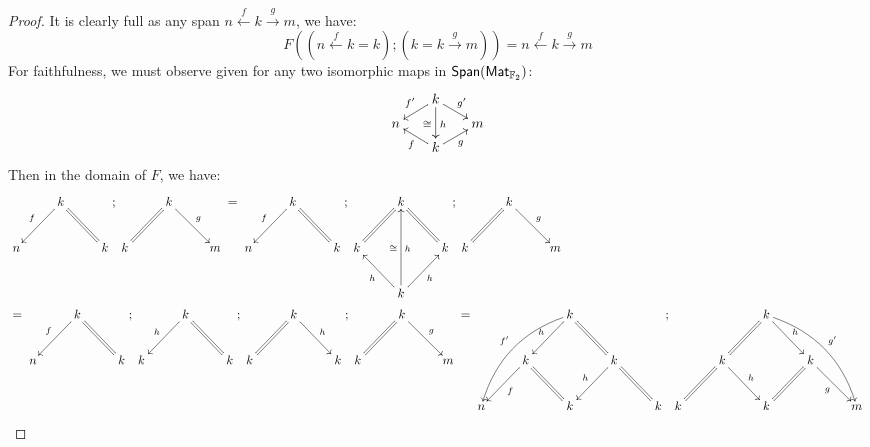 \begin{proof}
It is clearly full as any span $ n \xleftarrow{ f}  k \xrightarrow{g } m$, we have:
$$
F\left( (n \xleftarrow{f} k = k);(k = k \xrightarrow{g} m) \right)=n \xleftarrow{ f}  k \xrightarrow{g } m
$$ 
For faithfulness, we must observe given for any two isomorphic maps in $\mathsf{Span}(\mathsf{Mat}_{\mathbb{F}_2})$:
$$
\xymatrixrowsep{2mm}\xymatrixcolsep{6mm}
\xymatrix{
          & k \ar[dl]_{f'} \ar[dd]_{\cong}^{h} \ar[dr]^{g'}\\
n  &                                                                                                    & m\\
         & k \ar[ul]^{f} \ar[ur]_{g}\\
}
$$
Then in the domain of $F$, we have:
{
\xymatrixrowsep{0mm}\xymatrixcolsep{1.7mm}
\begin{align*}
&
\xymatrix{
   & k \ar[dl]_f \ar@{=}[dr]\\
n &                                      &k
};
\xymatrix{
   & k \ar[dr]^g \ar@{=}[dl]\\
k &                                      &m
}
 =
\xymatrix{
   & k \ar[dl]_f \ar@{=}[dr]\\
n &                                      &k
};
\xymatrix{
   & k \ar@{=}[dl] \ar@{=}[dr]\\
k &                                             & k\\
   & k \ar[ul]^h \ar[ur]_h \ar[uu]^\cong_h
};
\xymatrix{
   & k \ar[dr]^g \ar@{=}[dl]\\
k &                                      &m
}\\
 &=
\xymatrix{
   & k \ar[dl]_f \ar@{=}[dr]\\
n &                                      &k
};
\xymatrix{
   & k \ar[dl]_h \ar@{=}[dr]\\
k &                                         & k
};
\xymatrix{
   & k \ar[dr]^h \ar@{=}[dl]\\
k &                                         & k
};
\xymatrix{
   & k \ar[dr]^g \ar@{=}[dl]\\
k &                                      &m
}
=
\xymatrix{
            &                                                        &k \ar[dl]_{h} \ar@{=}[dr] \ar@/_1.2pc/[ddll]_{f'}\\
            & k \ar@{=}[dr] \ar[dl]^{f}&                                                          & k \ar@{=}[dr] \ar[dl]_{h}\\
n &                                                         & k                                             &                                                         &k
};
\xymatrix{
            &                                                        & k \ar[dr]^{h} \ar@{=}[dl] \ar@/^1.2pc/[ddrr]^{g'}  \\
            & k \ar[dr]^{h}   \ar@{=}[dl] &                                                          & k \ar@{=}[dl] \ar[dr]_{g}\\
k &                                                         & k                                             &                                                         &m
}
\end{align*}
}
 

\end{proof}
